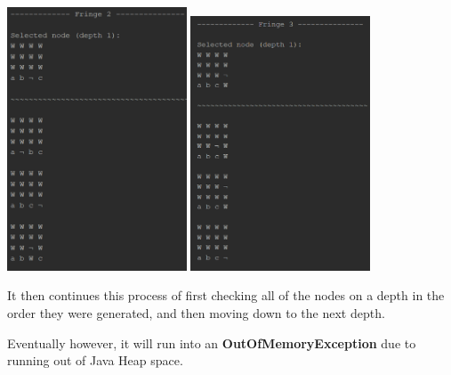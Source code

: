 \documentclass{article}
\begin{document}
	\newpage
		
	\begin{multicols}{2}[\columnsep=2cm]
		\includegraphics[width=0.4\textwidth,keepaspectratio]{BFS-2-2-1.png}
		\columnbreak
		\includegraphics[width=0.4\textwidth,keepaspectratio]{BFS-2-2-2.png}
	\end{multicols}
	
	It then continues this process of first checking all of the nodes on a depth in the order they were generated, and then moving down to the next depth.
	
	Eventually however, it will run into an \textbf{OutOfMemoryException} due to running out of Java Heap space.
	
\end{document}
